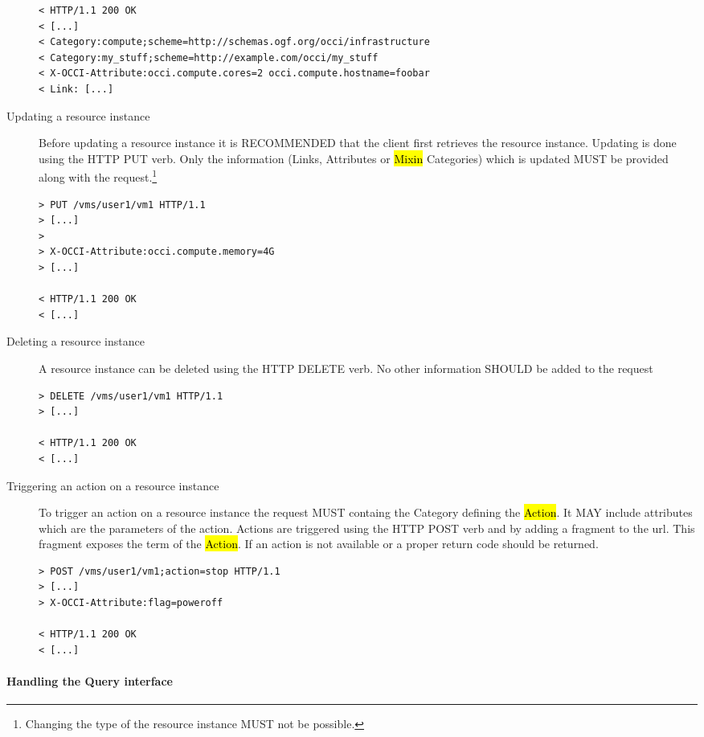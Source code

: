 \documentclass[10pt,a4paper]{article}
\begin{document}
\begin{description}
\begin{verbatim}
< HTTP/1.1 200 OK
< [...]
< Category:compute;scheme=http://schemas.ogf.org/occi/infrastructure
< Category:my_stuff;scheme=http://example.com/occi/my_stuff
< X-OCCI-Attribute:occi.compute.cores=2 occi.compute.hostname=foobar
< Link: [...]
\end{verbatim}

\item[Updating a resource instance] Before updating a resource
  instance it is RECOMMENDED that the client first retrieves the
  resource instance. Updating is done using the HTTP PUT verb. Only
  the information (Links, Attributes or \hl{Mixin} Categories) which
  is updated MUST be provided along with the
  request.\footnote{Changing the type of the resource instance MUST
    not be possible.}
\begin{verbatim}
> PUT /vms/user1/vm1 HTTP/1.1
> [...]
> 
> X-OCCI-Attribute:occi.compute.memory=4G
> [...]
 
< HTTP/1.1 200 OK
< [...]
\end{verbatim}

\item[Deleting a resource instance] A resource instance can be deleted
  using the HTTP DELETE verb. No other information SHOULD be added to
  the request
\begin{verbatim}
> DELETE /vms/user1/vm1 HTTP/1.1
> [...]

< HTTP/1.1 200 OK
< [...]
\end{verbatim}

\item[Triggering an action on a resource instance] To trigger an
  action on a resource instance the request MUST containg the Category
  defining the \hl{Action}. It MAY include attributes which are the
  parameters of the action. Actions are triggered using the HTTP POST
  verb and by adding a fragment to the url. This fragment exposes the
  term of the \hl{Action}. If an action is not available or a proper
  return code should be returned.
\begin{verbatim}
> POST /vms/user1/vm1;action=stop HTTP/1.1
> [...]
> X-OCCI-Attribute:flag=poweroff

< HTTP/1.1 200 OK
< [...]
\end{verbatim}
\end{description}

\paragraph{Handling the Query interface}
\end{document}
